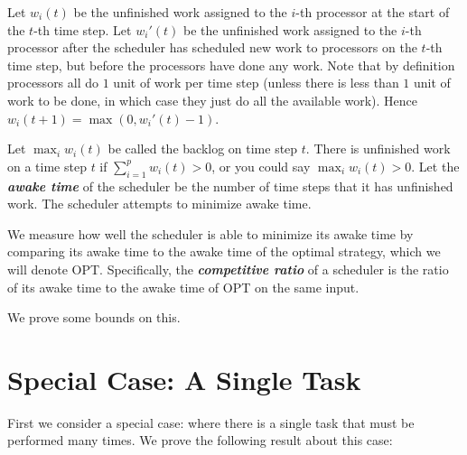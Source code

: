 \documentclass{article}[11pt]
\newcommand{\defn}[1]{{\textit{\textbf{\boldmath #1}}}\xspace}
\renewcommand{\paragraph}[1]{\vspace{0.09in}\noindent{\bf \boldmath #1.}}
\begin{document}
Let $w_i(t)$ be the unfinished work assigned to the $i$-th
processor at the start of the $t$-th time step.
Let $w_i'(t)$ be the unfinished work assigned to the $i$-th
processor after the scheduler has scheduled new work to
processors on the $t$-th time step, but before the processors
have done any work. Note that by definition processors all do $1$
unit of work per time step (unless there is less than $1$ unit of
work to be done, in which case they just do all the available
work). Hence $w_i(t+1) = \max(0, w_i'(t) - 1)$.

Let $\max_i w_i(t)$ be called the backlog on time step $t$.
There is unfinished work on a time step $t$ if $\sum_{i=1}^p
w_i(t) > 0$, or you could say $\max_i w_i(t) > 0$.
Let the \defn{awake time} of the scheduler be the number of time
steps that it has unfinished work.
The scheduler attempts to minimize awake time.

We measure how well the scheduler is able to minimize its awake
time by comparing its awake time to the awake time of the optimal
strategy, which we will denote OPT.
Specifically, the \defn{competitive ratio} of a scheduler is the ratio
of its awake time to the awake time of OPT on the same input.

\paragraph{Results}
We prove some bounds on this.

\section{Special Case: A Single Task}
First we consider a special case: where there is a single task
that must be performed many times.
We prove the following result about this case:
\end{document}
